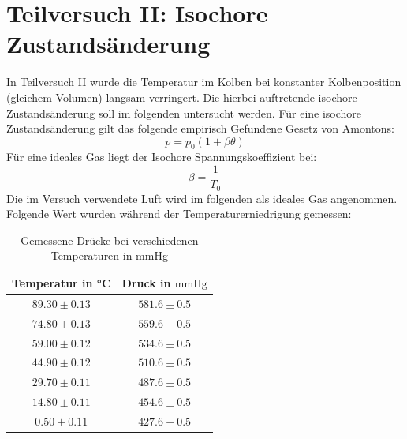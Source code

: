\documentclass{report}
\begin{document}
\section{Teilversuch II: Isochore Zustandsänderung}
In Teilversuch II wurde die Temperatur im Kolben bei konstanter Kolbenposition (gleichem Volumen) langsam verringert. Die hierbei auftretende isochore Zustandsänderung 
soll im folgenden untersucht werden. 
Für eine isochore Zustandsänderung gilt das folgende empirisch Gefundene Gesetz von Amontons:
\begin{equation}
    p = p_0(1+\beta \theta)
    \label{eq:Amontons}
\end{equation}
Für eine ideales Gas liegt der Isochore Spannungskoeffizient bei:
\begin{equation}
    \beta = \frac{1}{T_0}
\end{equation}
Die im Versuch verwendete Luft wird im folgenden als ideales Gas angenommen.
Folgende Wert wurden während der Temperaturerniedrigung gemessen:
\begin{table}[H]
        \begin{center}
                \begin{tabular}{|c|c|}
                        \hline
                        Temperatur in °C & Druck in $\mathrm{mmHg}$ \\
                        \hline
                        $89.30 \pm 0.13$ & $581.6 \pm 0.5$ \\
                        \hline
                        $74.80 \pm 0.13$ & $559.6 \pm 0.5$ \\
                        \hline
                        $59.00 \pm 0.12$ & $534.6 \pm 0.5$ \\
                        \hline
                        $44.90 \pm 0.12$ & $510.6 \pm 0.5$ \\
                        \hline
                        $29.70 \pm 0.11$ & $487.6 \pm 0.5$ \\
                        \hline
                        $14.80 \pm 0.11$ & $454.6 \pm 0.5$ \\
                        \hline
                        $0.50 \pm 0.11$ & $427.6 \pm 0.5$ \\
                        \hline
                \end{tabular}
        \end{center}
        \caption{Gemessene Drücke bei verschiedenen Temperaturen in mmHg}
        \label{tab:IsochorPmmHg}
\end{table}
\end{document}
